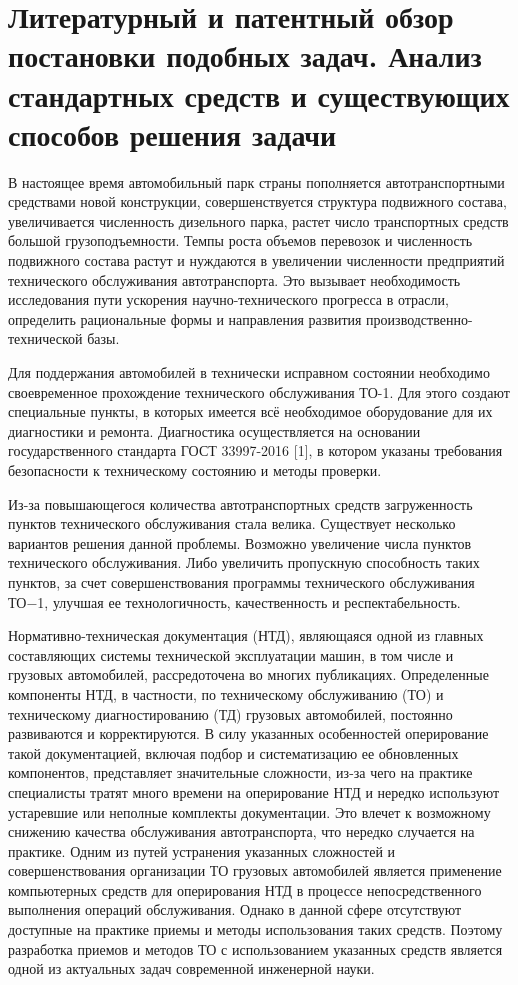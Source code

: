 \documentclass[../nirs.tex]{subfiles}
\begin{document}
\section{Литературный и патентный обзор постановки подобных задач.
Анализ стандартных средств и существующих способов решения задачи}

В настоящее время автомобильный парк страны пополняется автотранспортными
средствами новой конструкции, совершенствуется структура подвижного состава,
увеличивается численность дизельного парка, растет число транспортных средств
большой грузоподъемности. Темпы роста объемов перевозок и численность подвижного
состава растут и нуждаются в увеличении численности предприятий технического
обслуживания автотранспорта. Это вызывает необходимость исследования пути
ускорения научно-технического прогресса в отрасли, определить рациональные формы
и направления развития производственно-технической базы.

Для поддержания автомобилей в технически исправном состоянии необходимо
своевременное прохождение технического обслуживания ТО-1. Для этого создают
специальные пункты, в которых имеется всё необходимое оборудование для их
диагностики и ремонта. Диагностика осуществляется на основании государственного
стандарта ГОСТ 33997-2016 [1], в котором указаны требования безопасности к
техническому состоянию и методы проверки.

Из-за повышающегося количества автотранспортных средств загруженность пунктов
технического обслуживания стала велика. Существует несколько вариантов решения
данной проблемы. Возможно увеличение числа пунктов технического обслуживания.
Либо увеличить пропускную способность таких пунктов, за счет совершенствования
программы технического обслуживания ТО−1, улучшая ее технологичность,
качественность и респектабельность.

Нормативно-техническая документация (НТД), являющаяся одной из главных
составляющих системы технической эксплуатации машин, в том числе и грузовых
автомобилей, рассредоточена во многих публикациях. Определенные компоненты НТД,
в частности, по техническому обслуживанию (ТО) и техническому диагностированию
(ТД) грузовых автомобилей, постоянно развиваются и корректируются.
В силу указанных особенностей оперирование такой документацией,
включая подбор и систематизацию ее обновленных компонентов, представляет
значительные сложности, из-за чего на практике специалисты тратят много времени
на оперирование НТД и нередко используют устаревшие или неполные комплекты
документации. Это влечет к возможному снижению качества обслуживания
автотранспорта, что нередко случается на практике.
Одним из путей устранения указанных сложностей и совершенствования организации
ТО грузовых автомобилей является применение компьютерных средств для
оперирования НТД в процессе непосредственного выполнения операций обслуживания.
Однако в данной сфере отсутствуют доступные на практике приемы и методы
использования таких средств. Поэтому разработка приемов и методов ТО с
использованием указанных средств является одной из актуальных задач современной
инженерной науки.
\end{document}
